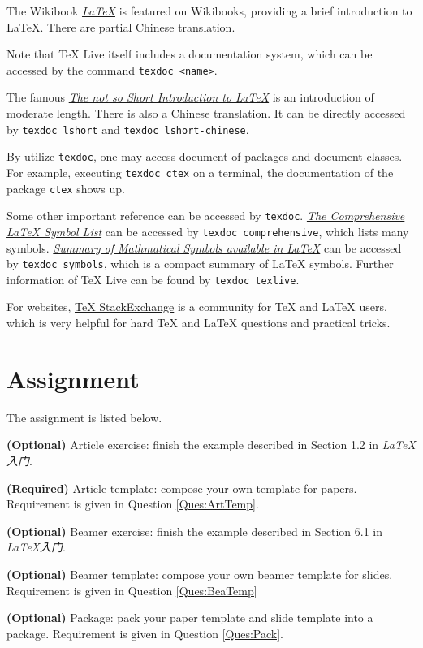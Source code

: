 \documentclass[english]{../TeXTemplate/pkupaper}
\begin{document}
The Wikibook \href{https://en.wikibooks.org/wiki/LaTeX}{\emph{\LaTeX}} is featured on Wikibooks, providing a brief introduction to \LaTeX. There are partial Chinese translation.

Note that \TeX{} Live itself includes a documentation system, which can be accessed by the command \verb"texdoc <name>".

The famous \href{https://www.ctan.org/tex-archive/info/lshort/english/}{\emph{The not so Short Introduction to \LaTeX}} is an introduction of moderate length. There is also a \href{ https://www.ctan.org/tex-archive/info/lshort/chinese}{Chinese translation}. It can be directly accessed by \verb"texdoc lshort" and \verb"texdoc lshort-chinese".

By utilize \verb"texdoc", one may access document of packages and document classes. For example, executing \verb"texdoc ctex" on a terminal, the documentation of the package \verb"ctex" shows up.

Some other important reference can be accessed by \verb"texdoc". \href{https://www.ctan.org/tex-archive/info/symbols/comprehensive/}{\emph{The Comprehensive \LaTeX{} Symbol List}} can be accessed by \verb"texdoc comprehensive", which lists many symbols. \href{https://www.ctan.org/pkg/maths-symbols}{\emph{Summary of Mathmatical Symbols available in \LaTeX}} can be accessed by \verb"texdoc symbols", which is a compact summary of \LaTeX{} symbols. Further information of \TeX{} Live can be found by \verb"texdoc texlive".

For websites, \href{https://tex.stackexchange.com/}{TeX StackExchange} is a community for \TeX{} and \LaTeX{} users, which is very helpful for hard \TeX{} and \LaTeX{} questions and practical tricks.

\section{Assignment}

The assignment is listed below.

\begin{partlist}
\item \textbf{(Optional)} Article exercise: finish the example described in Section 1.2 in \emph{\LaTeX 入门}.
\item \textbf{(Required)} Article template: compose your own template for papers. Requirement is given in Question \ref{Ques:ArtTemp}.
\item \textbf{(Optional)} Beamer exercise: finish the example described in Section 6.1 in \emph{\LaTeX 入门}.
\item \textbf{(Optional)} Beamer template: compose your own beamer template for slides. Requirement is given in Question \ref{Ques:BeaTemp}
\item \textbf{(Optional)} Package: pack your paper template and slide template into a package. Requirement is given in Question \ref{Ques:Pack}.
\end{partlist}
\end{document}
